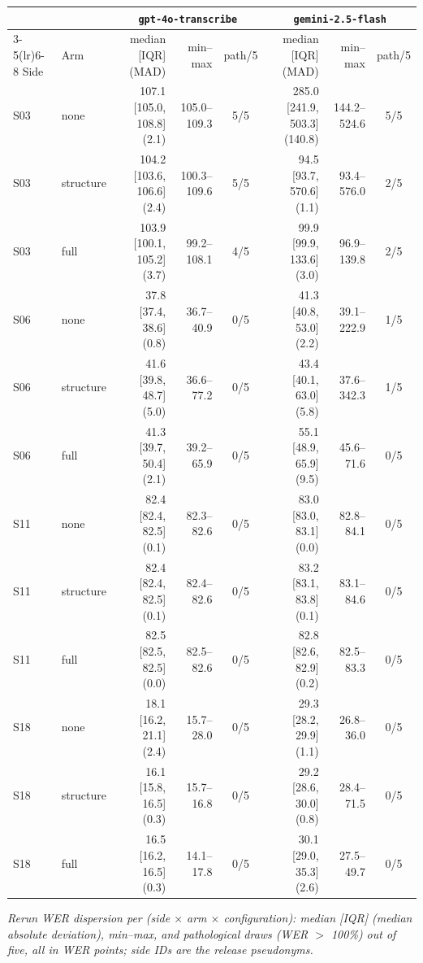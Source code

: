\documentclass[11pt]{article}
\begin{document}
\begin{center}
\scriptsize
\setlength{\tabcolsep}{3pt}
\begin{tabular}{@{}ll rrc rrc@{}}
\toprule
& & \multicolumn{3}{c}{\texttt{gpt-4o-transcribe}} & \multicolumn{3}{c}{\texttt{gemini-2.5-flash}} \\
\cmidrule(lr){3-5}\cmidrule(lr){6-8}
Side & Arm & median [IQR] (MAD) & min--max & path/5 & median [IQR] (MAD) & min--max & path/5 \\
\midrule
S03 & none & 107.1 [105.0, 108.8] (2.1) & 105.0--109.3 & 5/5 & 285.0 [241.9, 503.3] (140.8) & 144.2--524.6 & 5/5 \\
S03 & structure & 104.2 [103.6, 106.6] (2.4) & 100.3--109.6 & 5/5 & 94.5 [93.7, 570.6] (1.1) & 93.4--576.0 & 2/5 \\
S03 & full & 103.9 [100.1, 105.2] (3.7) & 99.2--108.1 & 4/5 & 99.9 [99.9, 133.6] (3.0) & 96.9--139.8 & 2/5 \\
\addlinespace
S06 & none & 37.8 [37.4, 38.6] (0.8) & 36.7--40.9 & 0/5 & 41.3 [40.8, 53.0] (2.2) & 39.1--222.9 & 1/5 \\
S06 & structure & 41.6 [39.8, 48.7] (5.0) & 36.6--77.2 & 0/5 & 43.4 [40.1, 63.0] (5.8) & 37.6--342.3 & 1/5 \\
S06 & full & 41.3 [39.7, 50.4] (2.1) & 39.2--65.9 & 0/5 & 55.1 [48.9, 65.9] (9.5) & 45.6--71.6 & 0/5 \\
\addlinespace
S11 & none & 82.4 [82.4, 82.5] (0.1) & 82.3--82.6 & 0/5 & 83.0 [83.0, 83.1] (0.0) & 82.8--84.1 & 0/5 \\
S11 & structure & 82.4 [82.4, 82.5] (0.1) & 82.4--82.6 & 0/5 & 83.2 [83.1, 83.8] (0.1) & 83.1--84.6 & 0/5 \\
S11 & full & 82.5 [82.5, 82.5] (0.0) & 82.5--82.6 & 0/5 & 82.8 [82.6, 82.9] (0.2) & 82.5--83.3 & 0/5 \\
\addlinespace
S18 & none & 18.1 [16.2, 21.1] (2.4) & 15.7--28.0 & 0/5 & 29.3 [28.2, 29.9] (1.1) & 26.8--36.0 & 0/5 \\
S18 & structure & 16.1 [15.8, 16.5] (0.3) & 15.7--16.8 & 0/5 & 29.2 [28.6, 30.0] (0.8) & 28.4--71.5 & 0/5 \\
S18 & full & 16.5 [16.2, 16.5] (0.3) & 14.1--17.8 & 0/5 & 30.1 [29.0, 35.3] (2.6) & 27.5--49.7 & 0/5 \\
\bottomrule
\end{tabular}
\normalsize
\end{center}

\noindent\footnotesize\emph{Rerun WER dispersion per (side $\times$ arm $\times$ configuration): median [IQR] (median absolute deviation), min--max, and pathological draws (WER $>$ 100\%) out of five, all in WER points; side IDs are the release pseudonyms.}\normalsize
\end{document}
